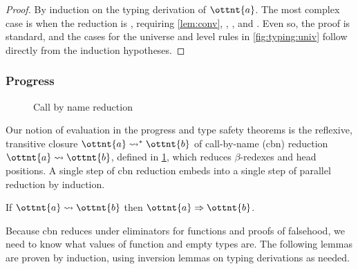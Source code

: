 \documentclass[a4paper,UKenglish,cleveref,autoref,thm-restate]{lipics-v2021}
\begin{document}
\begin{proof}
  By induction on the typing derivation of $\ottnt{a}$.
  The most complex case is when the reduction is ,
  requiring \cref{lem:conv}, ,
  , and .
  Even so, the proof is standard,
  and the cases for the universe and level rules in \cref{fig:typing:univ}
  follow directly from the induction hypotheses.
\end{proof}

\subsubsection{Progress}

\begin{figure}
\caption{Call by name reduction}
\label{fig:cbn}
\end{figure}

Our notion of evaluation in the progress and type safety theorems
is the reflexive, transitive closure  $ \ottnt{a}  \rightsquigarrow^\ast  \ottnt{b} $
of call-by-name (cbn) reduction $ \ottnt{a}  \rightsquigarrow  \ottnt{b} $,
defined in \cref{fig:cbn},
which reduces $\beta$-redexes and head positions.
A single step of cbn reduction embeds into
a single step of parallel reduction by induction.

\begin{lemma}
  If $ \ottnt{a}  \rightsquigarrow  \ottnt{b} $ then $ \ottnt{a}  \Rightarrow  \ottnt{b} $.
\end{lemma}

Because cbn reduces under eliminators for functions and proofs of falsehood,
we need to know what values of function and empty types are.
The following lemmas are proven by induction,
using inversion lemmas on typing derivations as needed.
\end{document}
